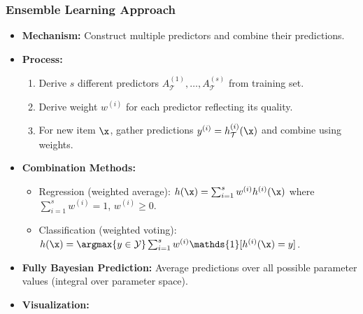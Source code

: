 \subsubsection*{Ensemble Learning Approach}
\begin{itemize}
    \item \textbf{Mechanism:} Construct multiple predictors and combine their predictions.
    \item \textbf{Process:}
    \begin{enumerate}
        \item Derive $s$ different predictors $A^{(1)}_{\mathcal{T}}, \ldots, A^{(s)}_{\mathcal{T}}$ from training set.
        \item Derive weight $w^{(i)}$ for each predictor reflecting its quality.
        \item For new item $\x$, gather predictions $y^{(i)} = h^{(i)}_{\mathcal{T}}(\x)$ and combine using weights.
    \end{enumerate}
    \item \textbf{Combination Methods:}
    \begin{itemize}
        \item Regression (weighted average): $h(\x) = \sum_{i=1}^s w^{(i)} h^{(i)}(\x)$ where $\sum_{i=1}^s w^{(i)} = 1$, $w^{(i)} \geq 0$.
        \item Classification (weighted voting): $h(\x) = \argmax{y \in \mathcal{Y}} \sum_{i=1}^s w^{(i)} \mathds{1}[h^{(i)}(\x) = y]$.
    \end{itemize}
    \item \textbf{Fully Bayesian Prediction:} Average predictions over all possible parameter values (integral over parameter space).
    \item \textbf{Visualization:}
    \begin{center}
\end{center}
\end{itemize}
